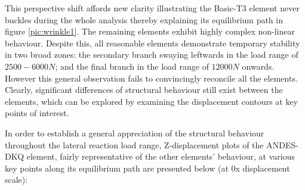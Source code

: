 This perspective shift affords new clarity illustrating the Basic-T3 element never buckles during the whole analysis thereby explaining its equilibrium path in figure \ref{pic:wrinkle1}. The remaining elements exhibit highly complex non-linear behaviour. Despite this, all reasonable elements demonstrate temporary stability in two broad zones: the secondary branch swaying leftwards in the load range of $2500 - 6000N$; and the final branch in the load range of $12000 N$ onwards. However this general observation fails to convincingly reconcile all the elements. Clearly, significant differences of structural behaviour still exist between the elements, which can be explored by examining the displacement contours at key points of interest.

In order to establish a general appreciation of the structural behaviour throughout the lateral reaction load range, Z-displacement plots of the ANDES-DKQ element, fairly representative of the other elements' behaviour, at various key points along its equilibrium path are presented below (at 0x displacement scale):

